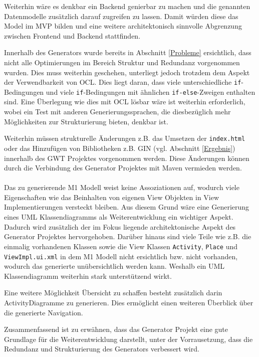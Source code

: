 Weiterhin wäre es denkbar ein Backend genierbar zu machen und die
genannten Datenmodelle zusätzlich darauf zugreifen zu lassen. Damit würden
diese das Model im MVP bilden und eine weitere architektonisch sinnvolle Abgrenzung zwischen Frontend
und Backend stattfinden.

Innerhalb des Generators wurde bereits in Abschnitt \ref{Probleme} ersichtlich,
dass nicht alle Optimierungen im Bereich Struktur und Redundanz vorgenommen wurden.
Dies muss weiterhin geschehen, unterliegt jedoch trotzdem dem Aspekt der
Verwendbarkeit von OCL. Dies liegt daran, dass viele
unterschiedliche \texttt{if}-Bedingungen und viele \texttt{if}-Bedingungen mit
ähnlichen \texttt{if-else}-Zweigen enthalten sind. Eine Überlegung wie dies mit
OCL lösbar wäre ist weiterhin erforderlich, wobei ein Test mit anderen Generierungssprachen,
die diesbezüglich mehr Möglichkeiten zur Strukturierung bieten, denkbar ist.

Weiterhin müssen strukturelle Änderungen z.B. das Umsetzen der
\texttt{index.html} oder das Hinzufügen von Bibliotheken z.B. GIN (vgl.
Abschnitt \ref{Ergebnis}) innerhalb des GWT Projektes vorgenommen werden. Diese
Änderungen können durch die Verbindung des Generator Projektes mit Maven vermieden werden.
\\\\
Das zu generierende M1 Modell weist keine Assoziationen auf, wodurch viele
Eigenschaften wie das Beinhalten von eigenen View Objekten in View
Implementierungen versteckt bleiben. Aus diesem Grund wäre eine Generierung
eines UML Klassendiagramms als Weiterentwicklung ein wichtiger Aspekt. Dadurch wird zusätzlich der im Fokus
liegende architektonische Aspekt des Generator Projektes hervorgehoben.
Darüber hinaus sind viele Teile wie z.B. die einmalig vorhandenen Klassen sowie die View
Klassen \texttt{Activity}, \texttt{Place} und \texttt{ViewImpl.ui.xml} in
dem M1 Modell nicht ersichtlich bzw. nicht vorhanden, wodurch das generierte
unübersichtlich werden kann. Weshalb ein UML Klassendiagramm weiterhin stark unterstützend wirkt. 

Eine weitere Möglichkeit Übersicht zu schaffen besteht zusätzlich darin
ActivityDiagramme zu generieren. Dies ermöglicht einen weiteren Überblick über
die generierte Navigation.

Zusammenfassend ist zu erwähnen, dass das Generator Projekt eine gute
Grundlage für die Weiterentwicklung darstellt, unter der Vorrausetzung, dass die
Redundanz und Strukturierung des Generators verbessert wird.